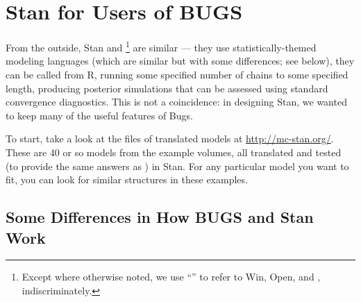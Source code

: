 \chapter{Stan for Users of BUGS}

From the outside, Stan and \BUGS%
%
\footnote{Except where otherwise noted, we use ``\BUGS'' to refer to
  Win\BUGS, Open\BUGS, and \JAGS, indiscriminately.}
%
are similar --- they use statistically-themed modeling languages
(which are similar but with some differences; see below), they can be
called from R, running some specified number of chains to some
specified length, producing posterior simulations that can be assessed
using standard convergence diagnostics.  This is not a coincidence:
in designing Stan, we wanted to keep many of the useful features of
Bugs.

To start, take a look at the files of translated \BUGS models at
\url{http://mc-stan.org/}.  These are 40 or so models from the \BUGS
example volumes, all translated and tested (to provide the same
answers as \BUGS) in Stan.  For any particular model you want to fit,
you can look for similar structures in these examples.

\section{Some Differences in How BUGS and Stan Work}

